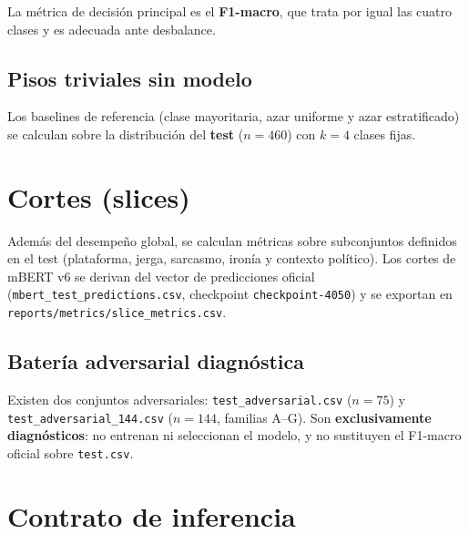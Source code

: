 La métrica de decisión principal es el \textbf{F1-macro}, que trata por igual
las cuatro clases y es adecuada ante desbalance.

\subsection{Pisos triviales sin modelo}

Los baselines de referencia (clase mayoritaria, azar uniforme y azar
estratificado) se calculan sobre la distribución del \textbf{test} ($n=460$) con
$k=4$ clases fijas.

\section{Cortes (slices)}

Además del desempeño global, se calculan métricas sobre subconjuntos
definidos en el test (plataforma, jerga, sarcasmo, ironía y contexto político).
Los cortes de mBERT v6 se derivan del vector de predicciones oficial
(\texttt{mbert\_test\_predictions.csv}, checkpoint \texttt{checkpoint-4050}) y
se exportan en \texttt{reports/metrics/slice\_metrics.csv}.

\subsection{Batería adversarial diagnóstica}

Existen dos conjuntos adversariales: \texttt{test\_adversarial.csv} ($n=75$) y
\texttt{test\_adversarial\_144.csv} ($n=144$, familias A--G). Son
\textbf{exclusivamente diagnósticos}: no entrenan ni seleccionan el modelo, y no
sustituyen el F1-macro oficial sobre \texttt{test.csv}.

\section{Contrato de inferencia}


